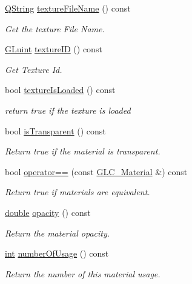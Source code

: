 \begin{DoxyCompactItemize}
\hyperlink{group___u_a_v_objects_plugin_gab9d252f49c333c94a72f97ce3105a32d}{Q\-String} \hyperlink{class_g_l_c___material_a613e5b94bdb8c477f516856f99a0f94c}{texture\-File\-Name} () const 
\begin{DoxyCompactList}\small\item\em Get the texture File Name. \end{DoxyCompactList}\item 
\hyperlink{glext_8h_a2f0c8cd5c21f9fcbd931c3f48bc90dfc}{G\-Luint} \hyperlink{class_g_l_c___material_acf6481aef086d6fb39bd951e5f7ffc1b}{texture\-I\-D} () const 
\begin{DoxyCompactList}\small\item\em Get Texture Id. \end{DoxyCompactList}\item 
bool \hyperlink{class_g_l_c___material_abc7c69d8f3285eacb07fa490fbdb7c32}{texture\-Is\-Loaded} () const 
\begin{DoxyCompactList}\small\item\em return true if the texture is loaded \end{DoxyCompactList}\item 
bool \hyperlink{class_g_l_c___material_a666aa1dc40a4fc637f2ed59d53715aea}{is\-Transparent} () const 
\begin{DoxyCompactList}\small\item\em Return true if the material is transparent. \end{DoxyCompactList}\item 
bool \hyperlink{class_g_l_c___material_a4d903402e9f305b47ee1b891eeb442a6}{operator==} (const \hyperlink{class_g_l_c___material}{G\-L\-C\-\_\-\-Material} \&) const 
\begin{DoxyCompactList}\small\item\em Return true if materials are equivalent. \end{DoxyCompactList}\item 
\hyperlink{_super_l_u_support_8h_a8956b2b9f49bf918deed98379d159ca7}{double} \hyperlink{class_g_l_c___material_a758252c431f1a478104b9db39f12d687}{opacity} () const 
\begin{DoxyCompactList}\small\item\em Return the material opacity. \end{DoxyCompactList}\item 
\hyperlink{ioapi_8h_a787fa3cf048117ba7123753c1e74fcd6}{int} \hyperlink{class_g_l_c___material_ad2aeb04fa687e0cc3170ccb13b4acf90}{number\-Of\-Usage} () const 
\begin{DoxyCompactList}\small\item\em Return the number of this material usage. \end{DoxyCompactList}\item 

\end{DoxyCompactItemize}
